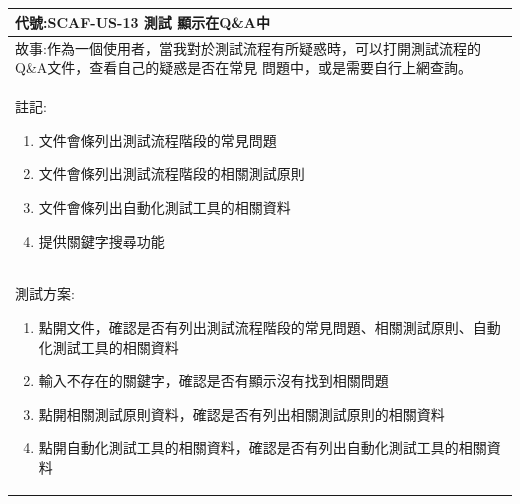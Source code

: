 \documentclass{report}
\begin{document}
\subsection*{}
\fontsize{12}{20}\selectfont
\begin{tabularx}{\textwidth}{|X|}
  \hline
  代號:SCAF-US-13 測試 顯示在Q\&A中 \\
  \hline
  故事:作為一個使用者，當我對於測試流程有所疑惑時，可以打開測試流程的Q\&A文件，查看自己的疑惑是否在常見
  問題中，或是需要自行上網查詢。 \\
  \hline
  註記:
  \begin{enumerate}
    \item 文件會條列出測試流程階段的常見問題
    \item 文件會條列出測試流程階段的相關測試原則
    \item 文件會條列出自動化測試工具的相關資料
    \item 提供關鍵字搜尋功能
  \end{enumerate} \\
  \hline
  測試方案:
  \begin{enumerate}
    \item 點開文件，確認是否有列出測試流程階段的常見問題、相關測試原則、自動化測試工具的相關資料
    \item 輸入不存在的關鍵字，確認是否有顯示沒有找到相關問題
    \item 點開相關測試原則資料，確認是否有列出相關測試原則的相關資料
    \item 點開自動化測試工具的相關資料，確認是否有列出自動化測試工具的相關資料
  \end{enumerate} \\
  \hline
\end{tabularx}
\end{document}
